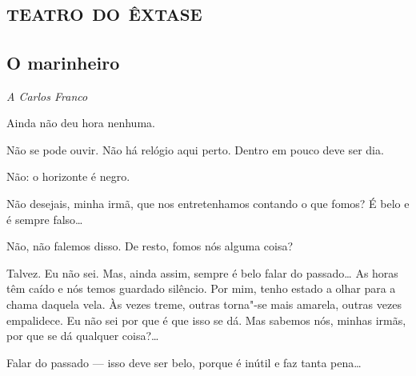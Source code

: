 \part{\textsc{teatro do êxtase}}



\chapter[O marinheiro]{O marinheiro}

\hfill\textit{A Carlos Franco}

\begingroup
\linenumbers


 Ainda não deu hora nenhuma.

 Não se pode ouvir. Não há relógio aqui perto.
Dentro em pouco deve ser dia.

 Não: o horizonte é negro.

 Não desejais, minha irmã, que nos entretenhamos
contando o
que fomos? É belo e é sempre falso\ldots{}

 Não, não falemos disso. De resto,
fomos nós alguma coisa?

 Talvez. Eu não sei. Mas, ainda assim,
sempre é belo falar do
passado\ldots{} As horas têm caído e nós temos guardado
silêncio. Por mim,
tenho estado a olhar para a chama daquela vela.
Às vezes treme, outras
torna"-se mais amarela, outras vezes empalidece.
Eu não sei por que é
que isso se dá. Mas sabemos nós, minhas irmãs, por
que se dá qualquer coisa?\ldots{}

\hfill{} 

 Falar do passado --- isso deve ser belo,
porque é inútil e faz tanta pena\ldots{}

